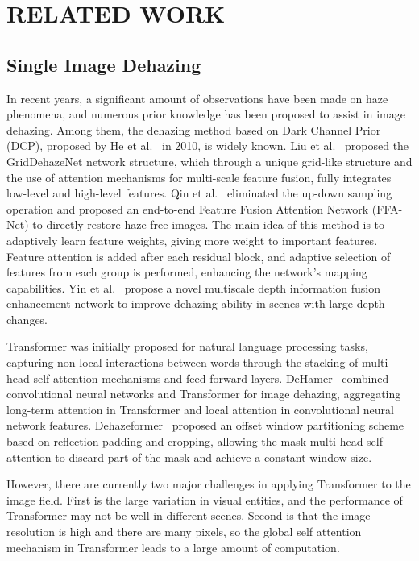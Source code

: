 \documentclass[lettersize,journal]{IEEEtran}
\begin{document}
\section{RELATED WORK}
\subsection{Single Image Dehazing}
In recent years, a significant amount of observations have been made on haze phenomena, and numerous prior knowledge has been proposed to assist in image dehazing. Among them, the dehazing method based on Dark Channel Prior (DCP), proposed by He et al.~\cite{he2010single} in 2010, is widely known. Liu et al.~\cite{liu2019griddehazenet} proposed the GridDehazeNet network structure, which through a unique grid-like structure and the use of attention mechanisms for multi-scale feature fusion, fully integrates low-level and high-level features. Qin et al.~\cite{qin2020ffa} eliminated the up-down sampling operation and proposed an end-to-end Feature Fusion Attention Network (FFA-Net) to directly restore haze-free images. The main idea of this method is to adaptively learn feature weights, giving more weight to important features. Feature attention is added after each residual block, and adaptive selection of features from each group is performed, enhancing the network's mapping capabilities. Yin et al.~\cite{yin2023multiscale} propose a novel multiscale depth information fusion enhancement network to improve dehazing ability in scenes with large depth changes. 

Transformer\cite{vaswani2017attention} was initially proposed for natural language processing tasks, capturing non-local interactions between words through the stacking of multi-head self-attention mechanisms and feed-forward layers. DeHamer~\cite{guo2022image} combined convolutional neural networks and Transformer for image dehazing, aggregating long-term attention in Transformer and local attention in convolutional neural network features. Dehazeformer~\cite{song2023vision} proposed an offset window partitioning scheme based on reflection padding and cropping, allowing the mask multi-head self-attention to discard part of the mask and achieve a constant window size.

However, there are currently two major challenges in applying Transformer to the image field. First is the large variation in visual entities, and the performance of Transformer may not be well in different scenes. Second is that the image resolution is high and there are many pixels, so the global self attention mechanism in Transformer leads to a large amount of computation.
\end{document}
